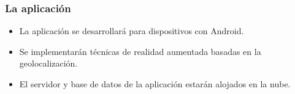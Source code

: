 
\begin{frame}
	\frametitle{La aplicación \ULLAR{}}
	\begin{itemize}
		\item La aplicación se desarrollará para dispositivos con Android. 
		\item Se implementarán técnicas de realidad aumentada basadas en la geolocalización.
		\item El servidor y base de datos de la aplicación estarán alojados en la nube.
	\end{itemize}
	\endblock{}
\end{frame}


\begin{frame}
\end{frame}


% 	


